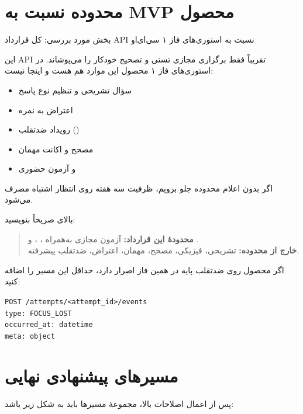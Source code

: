 \documentclass[a4paper,11pt]{article}
\newcommand{\apipath}[1]{\texttt{#1}}
\newcommand{\codeline}[1]{\apipath{#1}\\}
\begin{document}
\section{محدوده نسبت به MVP محصول}

\begin{apibox}
بخش مورد بررسی: کل قرارداد API نسبت به استوری‌های فاز ۱ سی‌ای‌او
\end{apibox}

\begin{problembox}
این API تقریباً فقط برگزاری مجازی تستی و تصحیح خودکار  را می‌پوشاند.
در استوری‌های فاز ۱ محصول این موارد هم هست و اینجا نیست:
\begin{itemize}
  \item سؤال تشریحی و تنظیم نوع پاسخ
  \item اعتراض به نمره
  \item رویداد ضدتقلب ()
  \item مصحح و اکانت مهمان
  \item {} و آزمون حضوری
\end{itemize}
اگر بدون اعلام محدوده جلو برویم، ظرفیت سه هفته روی انتظار اشتباه مصرف می‌شود.
\end{problembox}

\begin{solutionbox}
بالای  صریحاً بنویسید:

\begin{quote}
\textbf{محدودهٔ این قرارداد:} آزمون مجازی  به‌همراه ، ،  و .\\
\textbf{خارج از محدوده:} تشریحی،  فیزیکی، مصحح، مهمان، اعتراض، ضدتقلب پیشرفته.
\end{quote}

اگر محصول روی ضدتقلب پایه در همین فاز اصرار دارد، حداقل این مسیر را اضافه کنید:
\end{solutionbox}

\begin{codebox}
\codeline{POST /attempts/<attempt\_id>/events}
\codeline{type: FOCUS\_LOST}
\codeline{occurred\_at: datetime}
\apipath{meta: object}
\end{codebox}

\section{مسیرهای پیشنهادی نهایی}
پس از اعمال اصلاحات بالا، مجموعهٔ مسیرها باید به شکل زیر باشد:
\end{document}
